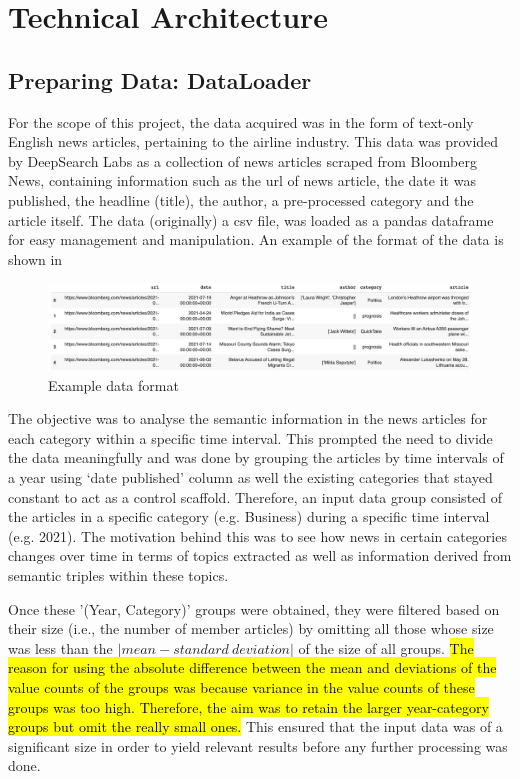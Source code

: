 \chapter{Technical Architecture}
\vspace*{-2ex}

\section{Preparing Data: DataLoader} \label{dataloader}

For the scope of this project, the data acquired was in the form of text-only English news articles, pertaining to the airline industry. This data was provided by DeepSearch Labs as a collection of news articles scraped from Bloomberg News, containing information such as the url of news article, the date it was published, the headline (title), the author, a pre-processed category and the article itself. The data (originally) a csv file, was loaded as a pandas dataframe for easy management and manipulation. An example of the format of the data is shown in~

\begin{figure}[H] 
\centering
\includegraphics[width=0.8\linewidth]{images/dataframe.png}
\caption{Example data format}
\label{dataframe}
\end{figure}

The objective was to analyse the semantic information in the news articles for each category within a specific time interval. This prompted the need to divide the data meaningfully and was done by grouping the articles by time intervals of a year using `date published' column as well the existing categories that stayed constant to act as a control scaffold. Therefore, an input data group consisted of the articles in a specific category (e.g. Business) during a specific time interval (e.g. 2021). The motivation behind this was to see how news in certain categories changes over time in terms of topics extracted as well as information derived from semantic triples within these topics.

Once these '(Year, Category)' groups were obtained, they were filtered based on their size (i.e., the number of member articles) by omitting all those whose size was less than the $| mean - standard \ deviation |$ of the size of all groups. \hl{The reason for using the absolute difference between the mean and deviations of the value counts of the groups was because variance in the value counts of these groups was too high. Therefore, the aim was to retain the larger year-category groups but omit the really small ones.} This ensured that the input data was of a significant size in order to yield relevant results before any further processing was done.  

